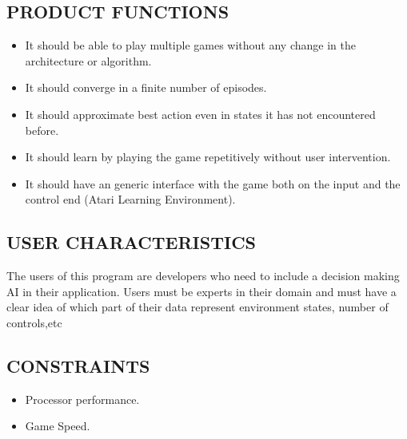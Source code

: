 \documentclass[twoside,letterpaper]{article}
\begin{document}
{\subsection[PRODUCT
FUNCTIONS]{\rmfamily\bfseries\color{black}
PRODUCT FUNCTIONS}
{\color{black}
\begin{itemize}
      \item It should be able to play multiple games without any change in the architecture or algorithm.
      \item It should converge in a finite number of episodes.
      \item It should approximate best action even in states it has not encountered before.
      \item It should learn by playing the game repetitively without user intervention.
      \item It should have an generic interface with the game both on the input and the control end (Atari Learning Environment).
  \end{itemize}
}

\subsection[USER
CHARACTERISTICS]{\rmfamily\bfseries\color{black}
USER CHARACTERISTICS}

{\color{black}
The users of this program are developers who need to include a decision making AI in their application. Users must be experts in their domain and must have a clear idea of which part of their data represent environment states, number of controls,etc}

\subsection[CONSTRAINTS]{\rmfamily\bfseries\color{black}
CONSTRAINTS}

{\color{black}
\begin{itemize}
      \item Processor performance.
      \item Game Speed.
  \end{itemize}}



\clearpage\setcounter{page}{1}\pagestyle{Convertv}
}
\end{document}
